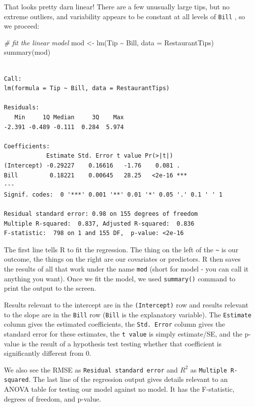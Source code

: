 \documentclass[
  letterpaper,
  DIV=11,
  numbers=noendperiod]{scrreprt}
\newenvironment{Shaded}{\begin{snugshade}}{\end{snugshade}}
\newcommand{\AttributeTok}[1]{\textcolor[rgb]{0.49,0.56,0.16}{#1}}
\newcommand{\CommentTok}[1]{\textcolor[rgb]{0.38,0.63,0.69}{\textit{#1}}}
\newcommand{\FunctionTok}[1]{\textcolor[rgb]{0.02,0.16,0.49}{#1}}
\newcommand{\NormalTok}[1]{\textcolor[rgb]{0.00,0.44,0.13}{#1}}
\newcommand{\OtherTok}[1]{\textcolor[rgb]{0.00,0.44,0.13}{#1}}
\newcommand{\SpecialCharTok}[1]{\textcolor[rgb]{0.25,0.44,0.63}{#1}}
\begin{document}
That looks pretty darn linear! There are a few unusually large tips, but
no extreme outliers, and variability appears to be constant at all
levels of \texttt{Bill} , so we proceed:

\begin{Shaded}
\begin{Highlighting}[]
\CommentTok{\# fit the linear model}
\NormalTok{mod }\OtherTok{\textless{}{-}} \FunctionTok{lm}\NormalTok{(Tip }\SpecialCharTok{\textasciitilde{}}\NormalTok{ Bill, }\AttributeTok{data =}\NormalTok{ RestaurantTips)}
\FunctionTok{summary}\NormalTok{(mod)}
\end{Highlighting}
\end{Shaded}

\begin{verbatim}

Call:
lm(formula = Tip ~ Bill, data = RestaurantTips)

Residuals:
   Min     1Q Median     3Q    Max 
-2.391 -0.489 -0.111  0.284  5.974 

Coefficients:
            Estimate Std. Error t value Pr(>|t|)    
(Intercept) -0.29227    0.16616   -1.76    0.081 .  
Bill         0.18221    0.00645   28.25   <2e-16 ***
---
Signif. codes:  0 '***' 0.001 '**' 0.01 '*' 0.05 '.' 0.1 ' ' 1

Residual standard error: 0.98 on 155 degrees of freedom
Multiple R-squared:  0.837, Adjusted R-squared:  0.836 
F-statistic:  798 on 1 and 155 DF,  p-value: <2e-16
\end{verbatim}

The first line tells R to fit the regression. The thing on the left of
the \texttt{\textasciitilde{}} is our outcome, the things on the right
are our covariates or predictors. R then saves the results of all that
work under the name \texttt{mod} (short for model - you can call it
anything you want). Once we fit the model, we used \texttt{summary()}
command to print the output to the screen.

Results relevant to the intercept are in the \texttt{(Intercept)} row
and results relevant to the slope are in the \texttt{Bill} row
(\texttt{Bill} is the explanatory variable). The \texttt{Estimate}
column gives the estimated coefficients, the \texttt{Std.\ Error} column
gives the standard error for these estimates, the \texttt{t\ value} is
simply estimate/SE, and the p-value is the result of a hypothesis test
testing whether that coefficient is significantly different from 0.

We also see the RMSE as \texttt{Residual\ standard\ error} and \(R^2\)
as \texttt{Multiple\ R-squared}. The last line of the regression output
gives details relevant to an ANOVA table for testing our model against
no model. It has the F-statistic, degrees of freedom, and p-value.
\end{document}
